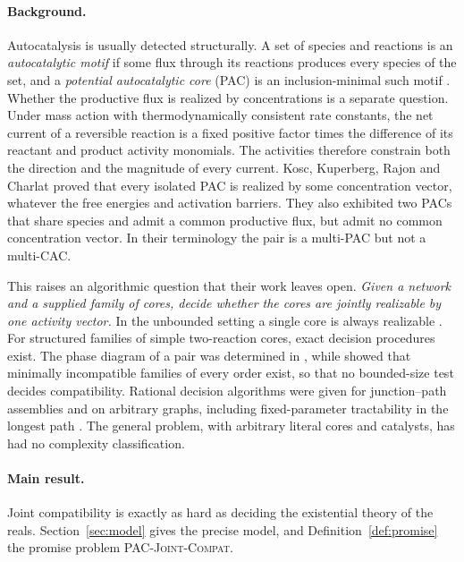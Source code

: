 \documentclass[11pt,a4paper]{article}
\theoremstyle{plain}
\theoremstyle{definition}
\theoremstyle{remark}
\newcommand{\PJC}{\textup{\textsc{PAC-Joint-Compat}}}
\begin{document}
\paragraph{Background.}
Autocatalysis is usually detected structurally. A set of species and reactions is an \emph{autocatalytic motif} if some flux through its reactions produces every species of the set, and a \emph{potential autocatalytic core} (PAC) is an inclusion-minimal such motif \citep{blokhuis2020,gagrani2024,kosc2025}. Whether the productive flux is realized by concentrations is a separate question. Under mass action with thermodynamically consistent rate constants, the net current of a reversible reaction is a fixed positive factor times the difference of its reactant and product activity monomials. The activities therefore constrain both the direction and the magnitude of every current. Kosc, Kuperberg, Rajon and Charlat \citep{kosc2025} proved that every isolated PAC is realized by some concentration vector, whatever the free energies and activation barriers. They also exhibited two PACs that share species and admit a common productive flux, but admit no common concentration vector. In their terminology the pair is a multi-PAC but not a multi-CAC.

This raises an algorithmic question that their work leaves open. \emph{Given a network and a supplied family of cores, decide whether the cores are jointly realizable by one activity vector.} In the unbounded setting a single core is always realizable \citep{kosc2025}. For structured families of simple two-reaction cores, exact decision procedures exist. The phase diagram of a pair was determined in \citep{tcic2026}, while \citep{tcch2026} showed that minimally incompatible families of every order exist, so that no bounded-size test decides compatibility. Rational decision algorithms were given for junction--path assemblies \citep{jp2026} and on arbitrary graphs, including fixed-parameter tractability in the longest path \citep{fpt2026}. The general problem, with arbitrary literal cores and catalysts, has had no complexity classification.

\paragraph{Main result.}
Joint compatibility is exactly as hard as deciding the existential theory of the reals. Section~\ref{sec:model} gives the precise model, and Definition~\ref{def:promise} the promise problem \PJC.
\end{document}
